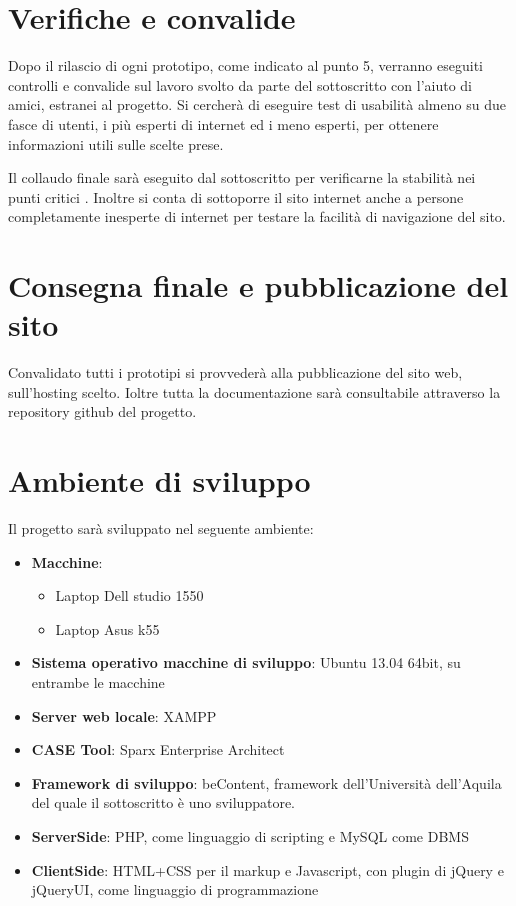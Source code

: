\documentclass[a4paper,12pt,hidelinks]{report}
\begin{document}
\section{Verifiche e convalide}
Dopo il rilascio di ogni prototipo, come indicato al punto 5, verranno eseguiti controlli e convalide sul lavoro svolto da parte del sottoscritto con l'aiuto di amici, estranei
al progetto. Si cercherà di eseguire test di usabilità almeno su due fasce di utenti, i più esperti di internet ed i meno esperti, per ottenere informazioni utili
sulle scelte prese.
\par Il collaudo finale sarà eseguito dal sottoscritto per verificarne la stabilità nei punti critici . Inoltre si conta di sottoporre il sito internet anche a persone
completamente inesperte di internet per testare la facilità di navigazione del sito.

\section{Consegna finale e pubblicazione del sito}
Convalidato tutti i prototipi si provvederà alla pubblicazione del sito web, sull'hosting scelto. Ioltre tutta la documentazione sarà consultabile attraverso la repository
github del progetto.

\section{Ambiente di sviluppo}
Il progetto sarà sviluppato nel seguente ambiente:
\begin{itemize}
 \item \textbf{Macchine}:
  \begin{itemize}
    \item Laptop Dell studio 1550 
    \item Laptop Asus k55
  \end{itemize}
 \item \textbf{Sistema operativo macchine di sviluppo}: Ubuntu 13.04 64bit, su entrambe le macchine
 \item \textbf{Server web locale}: XAMPP
 \item \textbf{CASE Tool}: Sparx Enterprise Architect
 \item \textbf{Framework di sviluppo}: beContent, framework dell'Università dell'Aquila del quale il sottoscritto è uno sviluppatore.
 \item \textbf{ServerSide}: PHP, come linguaggio di scripting e MySQL come DBMS
 \item \textbf{ClientSide}: HTML+CSS per il markup e Javascript, con plugin di jQuery e jQueryUI, come linguaggio di programmazione
\end{itemize}
\end{document}
